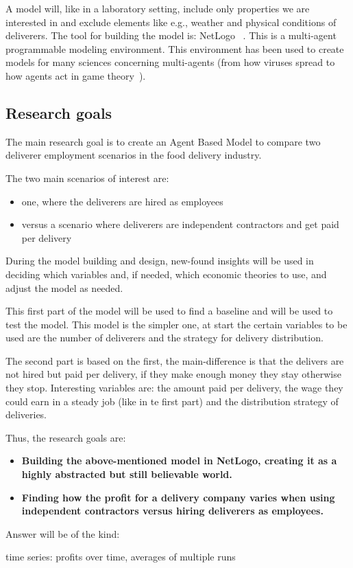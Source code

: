 A model will, like in a laboratory setting, include only properties we are interested in and exclude elements like e.g., weather and physical conditions of deliverers.
The tool for building the model is: NetLogo ~\cite{NetLogo2024}.
This is a multi-agent programmable modeling environment.
This environment has been used to create models for many sciences concerning multi-agents (from how viruses spread to how agents act in game theory~\cite{r2019agent}).


\subsection{Research goals}
The main research goal is to create an Agent Based Model to compare two deliverer employment scenarios in the food delivery industry.

The two main scenarios of interest are:
\begin{itemize}
    \item one, where the deliverers are hired as employees
    \item versus a scenario where deliverers are independent contractors and get paid per delivery
\end{itemize}

During the model building and design, new-found insights will be used in deciding which variables and, if needed, which economic theories to use, and adjust the model as needed.

This first part of the model will be used to find a baseline and will be used to test the model.
This model is the simpler one, at start the certain variables to be used are the number of deliverers and the strategy for delivery distribution.

The second part is based on the first, the main-difference is that the delivers are not hired but paid per delivery, if they make enough money they stay otherwise they stop.
Interesting variables are: the amount paid per delivery, the wage they could earn in a steady job (like in te first part) and the distribution strategy of deliveries.

Thus, the research goals are:
\begin{itemize}
 \item \textbf{Building the above-mentioned model in NetLogo, creating it as a highly abstracted but still believable world.}
 \item \textbf{Finding how the profit for a delivery company varies when using independent contractors versus hiring deliverers as employees.}
\end{itemize}

Answer will be of the kind:

time series: profits over time, averages of multiple runs



